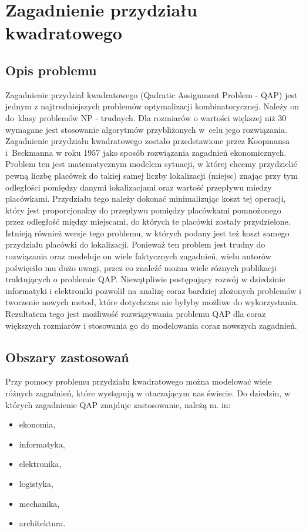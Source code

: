 \chapter{Zagadnienie przydziału kwadratowego}
\label{cha:qap}

\section{Opis problemu}
\label{sec:opis}
Zagadnienie przydział kwadratowego (Qadratic Assignment Problem - QAP) jest jednym z najtrudniejszych problemów optymalizacji kombinatorycznej. Należy on do~klasy problemów NP - trudnych. Dla rozmiarów o wartości większej niż 30 wymagane jest stosowanie algorytmów przybliżonych w~celu jego rozwiązania. Zagadnienie przydziału kwadratowego zostało przedstawione przez Koopmansa i~Beckmanna w roku 1957 jako sposób rozwiązania zagadnień ekonomicznych. Problem ten jest matematycznym modelem sytuacji, w której chcemy przydzielić pewną liczbę placówek do takiej samej liczby lokalizacji (miejsc) znając przy tym odległości pomiędzy danymi lokalizacjami oraz wartość przepływu miedzy placówkami. Przydziału tego należy dokonać minimalizując koszt tej operacji, który jest proporcjonalny do przepływu pomiędzy placówkami pomnożonego przez odległość między miejscami, do których te placówki zostały przydzielone. Istnieją również wersje tego problemu, w których podany jest też koszt samego przydziału placówki do lokalizacji. Ponieważ ten problem jest trudny do rozwiązania oraz modeluje on wiele faktycznych zagadnień, wielu autorów poświęciło mu dużo uwagi, przez co znaleźć można wiele różnych publikacji traktujących o problemie QAP. Niewątpliwie postępujący rozwój w dziedzinie informatyki i elektroniki pozwolił na analizę coraz bardziej złożonych problemów i tworzenie nowych metod, które dotychczas nie byłyby możliwe do wykorzystania. Rezultatem tego jest możliwość rozwiązywania problemu QAP dla coraz większych rozmiarów i stosowania go do modelowania coraz nowszych zagadnień.

\section{Obszary zastosowań}
\label{sec:zastosowanie}
Przy pomocy problemu przydziału kwadratowego można modelować wiele różnych zagadnień, które występują w otaczającym nas świecie. Do dziedzin, w których zagadnienie QAP znajduje zastosowanie, należą m. in:
\begin{itemize}
\item ekonomia,
\item informatyka,
\item elektronika,
\item logistyka,
\item mechanika,
\item architektura.
\end{itemize}

